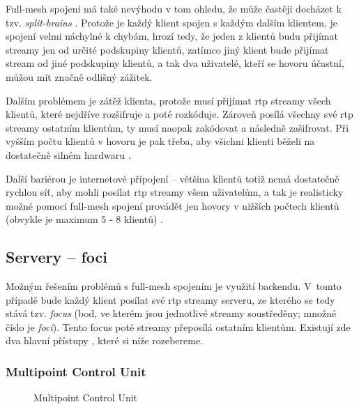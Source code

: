 Full-mesh spojení má také nevýhodu v tom ohledu, že může častěji docházet k tzv.
\textit{split-brains} \parencite{StephenHaddock-SplitBrainAvoidance}. Protože je
každý klient spojen s každým dalším klientem, je spojení velmi náchylné k
chybám, hrozí tedy, že jeden z klientů budu přijímat streamy jen od určité
podskupiny klientů, zatímco jiný klient bude přijímat stream od jiné podskupiny
klientů, a tak dva uživatelé, kteří se hovoru účastní, můžou mít značně odlišný
zážitek.

Dalším problémem je zátěž klienta, protože musí přijímat \gls{rtp} streamy všech
klientů, které nejdříve rozšifruje a poté rozkóduje. Zároveň posílá všechny své
\gls{rtp} streamy ostatním klientům, ty musí naopak zakódovat a následně
zašifrovat. Při vyšším počtu klientů v hovoru je pak třeba, aby všichni klienti
běželi na dostatečně silném hardwaru
\parencite{BBC-FirstWebcamMadeCoffeePotFamous,Red5Pro-WebRTCScalingApproaches}.

Další bariérou je internetové přípojení -- většina klientů totiž nemá dostatečně
rychlou síť, aby mohli posílat \gls{rtp} streamy všem uživatelům, a tak je
realisticky možné pomocí full-mesh spojení provádět jen hovory v nižších počtech
klientů (obvykle je maximum 5 - 8 klientů) \parencite{BlogGeek-WebRTCP2PMesh}.

\subsection{Servery -- foci}

Možným řešením problémů s full-mesh spojením je využití backendu. V~tomto
případě bude každý klient posílat své \gls{rtp} streamy serveru, ze kterého se
tedy stává tzv. \textit{focus} (bod, ve kterém jsou jednotlivé streamy
soustředěny; množné číslo je \textit{foci}). Tento focus poté streamy přeposílá
ostatním klientům. Existují zde dva hlavní přístupy
\parencite{Red5Pro-WebRTCScalingApproaches}, které si níže rozebereme.

\subsubsection{Multipoint Control Unit}\label{mcu}

\begin{figure}[H]
    \centering
    \caption{Multipoint Control Unit}
    \label{mcuFig}
\end{figure}

